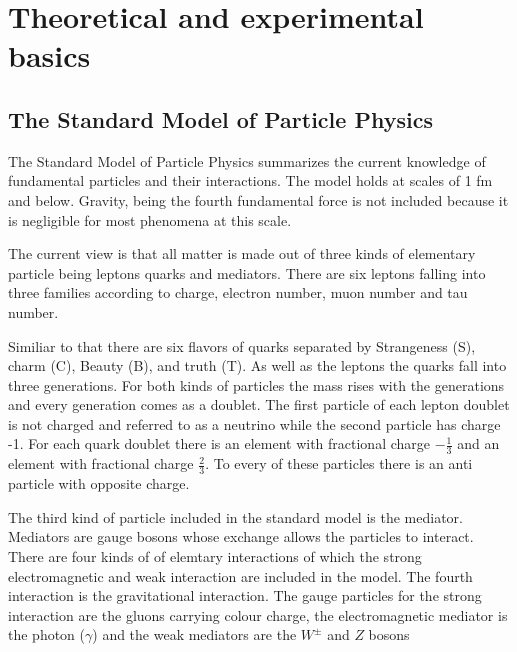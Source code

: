 \chapter{Theoretical and experimental basics}
\label{theory}

\section{The Standard Model of Particle Physics}

The Standard Model of Particle Physics summarizes the current knowledge of fundamental particles and their interactions. The model holds at scales of 1 fm and below. Gravity, being the fourth fundamental force is not included because it is negligible for most phenomena at this scale.

The current view is that all matter is made out of three kinds of elementary particle being leptons quarks and mediators.
There are six leptons falling into three families according to charge, electron number, muon number and tau number. 

Similiar to that there are six flavors of quarks separated by Strangeness (S), charm (C), Beauty (B), and truth (T). As well as the leptons the quarks fall into three generations.
For both kinds of particles the mass rises with the generations and every generation comes as a doublet. The first particle of each lepton doublet is not charged and referred to as a neutrino while the second particle has charge -1.
For each quark doublet there is an element with fractional charge $-\frac{1}{3}$ and an element with fractional charge $\frac{2}{3}$.
To every of these particles there is an anti particle with opposite charge.

The third kind of particle included in the standard model is the mediator. Mediators are gauge bosons whose exchange allows the particles to interact. There are four kinds of of elemtary interactions of which the strong electromagnetic and weak interaction are included in the model. The fourth interaction is the gravitational interaction.
The gauge particles for the strong interaction are the gluons carrying colour charge, the electromagnetic mediator is the photon ($\gamma$) and the weak mediators are the $W^{\pm}$ and $Z$ bosons 


